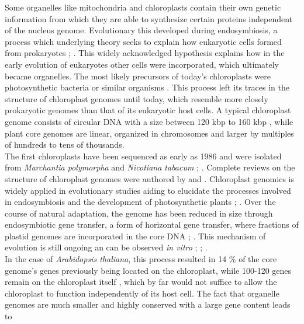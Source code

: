 Some organelles like mitochondria and chloroplasts contain their own genetic information
from which they are able to synthesize certain proteins independent of the nucleus
genome. Evolutionary this developed during endosymbiosis, a process which underlying
theory seeks to explain how eukaryotic cells formed from prokaryotes
\cite{mereschkowsky1905uber}; \cite{kutschera2005endosymbiosis}. This widely acknowledged
hypothesis explains how in the early evolution of eukaryotes other cells were
incorporated, which ultimately became organelles. The most likely precursors of today's
chloroplasts were photosynthetic bacteria or similar organisms
\cite{archibald2015endosymbiosis}. This process left its traces in the structure of
chloroplast genomes until today, which resemble more closely prokaryotic genomes than that
of its eukaryotic host cells. A typical chloroplast genome consists of circular DNA with a
size between 120 kbp to 160 kbp \cite{palmer_1985}, while plant core genomes are linear,
organized in chromosomes and larger by multiples of
hundreds to tens of thousands. \\
The first chloroplasts have been sequenced as early as 1986 and were isolated from
\textit{Marchantia polymorpha} and \textit{Nicotiana tabacum}
\cite{ohyama_chloroplast_1986}; \cite{shinozaki_complete_1986}. Complete reviews on the
structure of chloroplast genomes were authored by \cite{green_chloroplast_2011} and
\cite{wicke_evolution_2011}. Chloroplast genomics is widely applied in evolutionary
studies aiding to elucidate the processes involved in endosymbiosis and the development of
photosynthetic plants \cite{martin_evolutionary_2002};
\cite{xiao-ming_inferring_2017}. Over the course of natural adaptation, the genome has
been reduced in size through endosymbiotic gene transfer, a form of horizontal gene
transfer, where fractions of plastid genomes are incorporated in the core DNA
\cite{martin_evolutionary_2002}; \cite{deiner_environmental_2017}. This mechanism of
evolution is still ongoing an can be observed \textit{in vitro} \cite{bock2017witnessing};
\cite{fuentes2014horizontal}; \cite{stegemann2009exchange}. \\
In the case of \textit{Arabidopsis thaliana}, this process resulted in 14 \% of the core
genome's genes previously being located on the chloroplast, while 100-120 genes remain on
the chloroplast itself \cite{wicke_evolution_2011}, which by far would not suffice to
allow the chloroplast to function independently of its host cell. The fact that organelle
genomes are much smaller and highly conserved with a large gene content leads to
